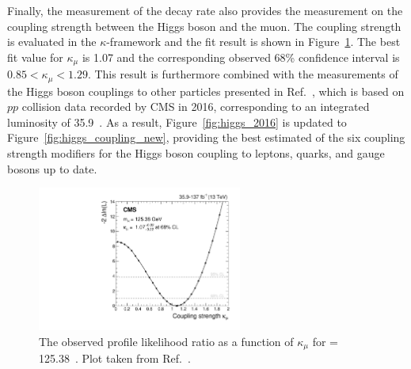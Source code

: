 Finally, the measurement of the \hmm decay rate also provides the measurement on the coupling strength between the Higgs boson and the muon.
The coupling strength is evaluated in the $\kappa$-framework \cite{Heinemeyer:2013tqa} and the fit result is shown in Figure~\ref{fig:kappa_scan}.
The best fit value for $\kappa_{\mu}$ is 1.07 and the corresponding observed 68\% confidence interval is $0.85 < \kappa_{\mu} < 1.29$.
This result is furthermore combined with the measurements of the Higgs boson couplings to other particles presented in Ref.~\cite{Sirunyan:2640611},
which is based on $pp$ collision data recorded by CMS in 2016, corresponding to an integrated luminosity of 35.9~\invfb.
As a result, Figure~\ref{fig:higgs_2016} is updated to Figure~\ref{fig:higgs_coupling_new}, providing the best estimated of 
the six coupling strength modifiers for the Higgs boson coupling to leptons, quarks, and gauge bosons up to date.

\begin{figure}[!htb]
    \centering
    \captionsetup{justification=justified}
    \includegraphics[width=0.60\textwidth]{pics/results/kappa_mu.pdf}
    \caption{The observed profile likelihood ratio as a function of $\kappa_{\mu}$ for \mh = 125.38~\GeV.
             Plot taken from Ref.~\cite{Sirunyan_2021}. }
    \label{fig:kappa_scan}
\end{figure}


